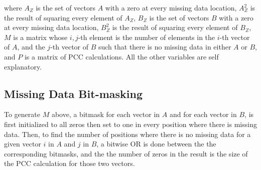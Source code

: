 \documentclass{bioinfo}
\begin{document}
\vspace{2mm}

\noindent where  $A_Z$ is the set of vectors $A$ with a zero at every 
missing data location, $A_Z^2$ is the result of squaring every element 
of $A_Z$, $B_Z$ is the set of vectors $B$ with a zero at every 
missing data location, $B_Z^2$ is the result of squaring every element 
of $B_Z$, $M$ is a matrix whose $i, j$-th element is the number of 
elements in the $i$-th vector of $A$, and the $j$-th vector of $B$ 
such that there is no missing data in either $A$ or $B$, and $P$ is 
a matrix of PCC calculations. All the other variables are self explanatory. \vspace*{-6pt}

\subsection{Missing Data Bit-masking} \label{MDBM}

To generate $M$ above, a bitmask for each vector in $A$ and for each vector in $B$, 
is first initialized to all zeros then set to one in every position where there is missing data.
Then, to find the number of positions where there is no missing data for a given vector $i$ 
in $A$ and $j$ in $B$, a bitwise OR is done between the the corresponding bitmasks, and the 
the number of zeros in the result is the size of the PCC calculation for those two vectors. \vspace*{-12pt}
\end{document}

